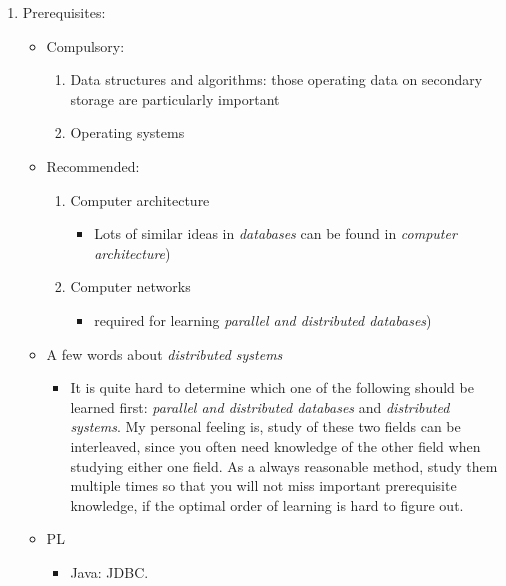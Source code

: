 \documentclass{article}
\begin{document}
\begin{enumerate}
    \item Prerequisites:
    \begin{itemize}
        \item Compulsory:
        \begin{enumerate}
            \item Data structures and algorithms: those operating data on secondary storage are particularly important
            \item Operating systems
        \end{enumerate}
        \item Recommended:
        \begin{enumerate}
            \item Computer architecture
            \begin{itemize}
                \item Lots of similar ideas in \emph{databases} can be found in \emph{computer architecture})
            \end{itemize}
            \item Computer networks
            \begin{itemize}
                \item required for learning \emph{parallel and distributed databases})
            \end{itemize}
        \end{enumerate}
        \item A few words about \emph{distributed systems}
        \begin{itemize}
            \item It is quite hard to determine which one of the following should be learned first: \emph{parallel and distributed databases} and \emph{distributed systems}.
            My personal feeling is, study of these two fields can be interleaved, since you often need knowledge of the other field when studying either one field.
            As a always reasonable method, study them multiple times so that you will not miss important prerequisite knowledge, if the optimal order of learning is hard to figure out.
        \end{itemize}
        \item PL
        \begin{itemize}
            \item Java: JDBC.
        \end{itemize}
    \end{itemize}
\end{enumerate}
\end{document}
